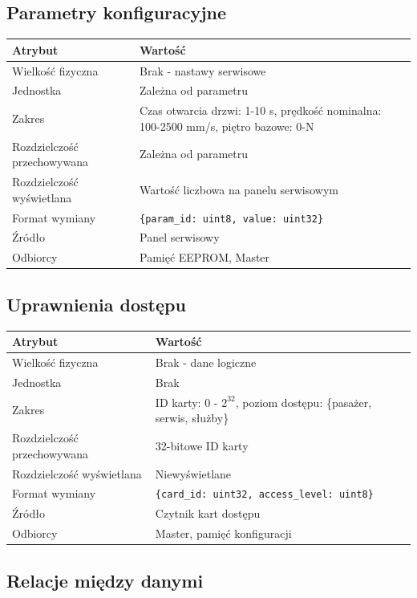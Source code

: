 \documentclass[a4paper,12pt]{article}
\begin{document}
\subsection{Parametry konfiguracyjne}

\begin{tabularx}{\textwidth}{lX}
\toprule
\textbf{Atrybut} & \textbf{Wartość} \\
\midrule
Wielkość fizyczna & Brak - nastawy serwisowe \\
Jednostka & Zależna od parametru \\
Zakres & Czas otwarcia drzwi: 1-10 s, prędkość nominalna: 100-2500 mm/s, piętro bazowe: 0-N \\
Rozdzielczość przechowywana & Zależna od parametru \\
Rozdzielczość wyświetlana & Wartość liczbowa na panelu serwisowym \\
Format wymiany & \texttt{\{param\_id: uint8, value: uint32\}} \\
Źródło & Panel serwisowy \\
Odbiorcy & Pamięć EEPROM, Master \\
\bottomrule
\end{tabularx}

\subsection{Uprawnienia dostępu}

\begin{tabularx}{\textwidth}{lX}
\toprule
\textbf{Atrybut} & \textbf{Wartość} \\
\midrule
Wielkość fizyczna & Brak - dane logiczne \\
Jednostka & Brak \\
Zakres & ID karty: 0 - $2^{32}$, poziom dostępu: \{pasażer, serwis, służby\} \\
Rozdzielczość przechowywana & 32-bitowe ID karty \\
Rozdzielczość wyświetlana & Niewyświetlane \\
Format wymiany & \texttt{\{card\_id: uint32, access\_level: uint8\}} \\
Źródło & Czytnik kart dostępu \\
Odbiorcy & Master, pamięć konfiguracji \\
\bottomrule
\end{tabularx}

\subsection{Relacje między danymi}
\end{document}
